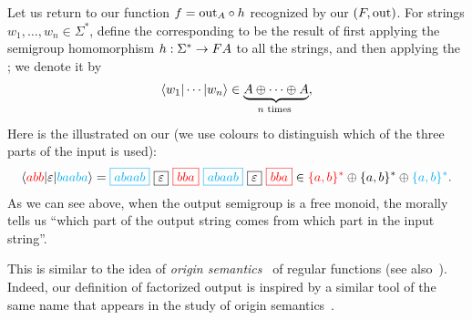 
\AP Let us return to our function $f = \mathrm{out}_A \circ h$ recognized by our  $(\functor,\outfun)$.
For strings $w_1,\ldots,w_n \in \Sigma^*$, define the corresponding  to be the result of first applying the semigroup homomorphism $h : \Sigma^* \to \functor A$ to all the strings, and then applying the ; we denote it by 
\begin{align*}
\tuple{w_1| \cdots | w_n} \in \myunderbrace{A \oplus \cdots \oplus A}{$n$ times},
\end{align*}
Here is the  illustrated on our  (we use colours to distinguish which of the three parts of the input is used):
\begin{align*}
  \tuple{\red{abb} | \varepsilon | \blue{baaba}} =  
  \blue{\boxed{abaab}} \ 
  \boxed{\varepsilon} \ 
  \red{\boxed{bba}} \ 
  \blue{\boxed{abaab}} \
  \boxed{\varepsilon} \
  \red{\boxed{bba}}
  \in \red{\set{a,b}^*} \oplus \set{a,b}^*  \oplus \blue{\set{a,b}^*}.
\end{align*}
As we can see above, when the output semigroup is a free monoid, the  morally tells us \enquote{which part of the output string comes from which part in the input string}.
\begin{remark}
This is similar to the idea of \emph{origin semantics}~\cite{bojanczykTransducersOriginInformation2014} of regular functions (see also~\cite[Section~5]{MuschollPuppis}). Indeed, our definition of factorized output is inspired by a similar tool of the same name that appears in the study of origin semantics~\cite[Section~2]{bojanczykTransducersOriginInformation2014}.
\end{remark}

